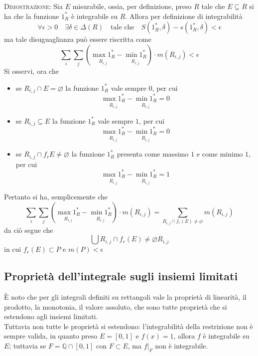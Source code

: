 \documentclass[a4paper]{extarticle}
\begin{document}
\vspace{2em}
\noindent
\normalfont \normalsize
\textsc{Dimostrazione}: Sia $E$ misurabile, ossia, per definizione, preso $R$ tale che $E \subseteq R$ si ha che la funzione $1^*_R$ è integrabile su $R$. Allora per definizione di integrabilità
\[\forall \epsilon > 0 \hspace{1em} \exists \delta \in \Delta(R) \hspace{1em} \text{tale che} \hspace{1em} S(1^*_R,\delta) - s(1^*_R,\delta) < \epsilon\]
ma tale disuguaglianza può essere riscritta come
\[\sum_i \sum_j \left(\underset{R_{i,j}}{\max 1^*_R} - \underset{R_{i,j}}{\min 1^*_R}\right) \cdot m(R_{i,j}) < \epsilon\]
Si osservi, ora che
\begin{itemize}
    \item se $R_{i,j} \cap E = \varnothing$ la funzione $1^*_R$ vale sempre $0$, per cui
    \[\underset{R_{i,j}}{\max 1^*_R} - \underset{R_{i,j}}{\min 1^*_R} = 0\]

    \item se $R_{i,j} \subseteq E$ la funzione $1^*_R$ vale sempre $1$, per cui
    \[\underset{R_{i,j}}{\max 1^*_R} - \underset{R_{i,j}}{\min 1^*_R} = 0\]

    \item se $R_{i,j} \cap f_r E \neq \varnothing$ la funzione $1^*_R$ presenta come massimo $1$ e come minimo $1$, per cui
    \[\underset{R_{i,j}}{\max 1^*_R} - \underset{R_{i,j}}{\min 1^*_R} = 1\]
\end{itemize}
Pertanto si ha, semplicemente che 
\[\sum_i \sum_j \left(\underset{R_{i,j}}{\max 1^*_R} - \underset{R_{i,j}}{\min 1^*_R}\right) \cdot m(R_{i,j}) = \sum_{R_{i,j} \cap f_r(E) \neq \varnothing} m(R_{i,j})\]
da ciò segue che
\[\bigcup{R_{i,j} \cap f_r(E) \neq \varnothing} R_{i,j}\]
in cui $f_r(E) \subset P$ e $m(P) < \epsilon$

\vspace{1em}
\noindent
\subsection{Proprietà dell'integrale sugli insiemi limitati}
È noto che per gli integrali definiti su rettangoli vale la proprietà di linearità, il prodotto, la monotonia, il valore assoluto, che sono tutte proprietà che si estendono agli insiemi limitati.\\
Tuttavia non tutte le proprietà si estendono: l'integrabilità della restrizione non è sempre valida, in quanto preso $E=[0,1]$ e $f(x)=1$, allora $f$ è integrabile su $E$; tuttavia se $F = \mathbb{Q} \cap [0,1]$ con $F \subset E$, ma $f \vert_F$ non è integrabile.
\end{document}
